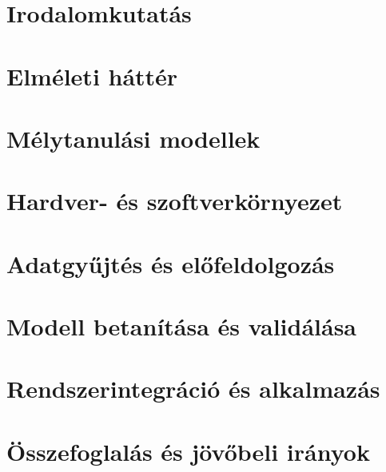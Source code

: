 \documentclass{sapientia-thesis}
\begin{document}
\chapter{Irodalomkutatás}


\chapter{Elméleti háttér}


\chapter{Mélytanulási modellek}


\chapter{Hardver- és szoftverkörnyezet}


\chapter{Adatgyűjtés és előfeldolgozás}


\chapter{Modell betanítása és validálása}


%

\chapter{Rendszerintegráció és alkalmazás}


\chapter{Összefoglalás és jövőbeli irányok}


%




%
\end{document}
